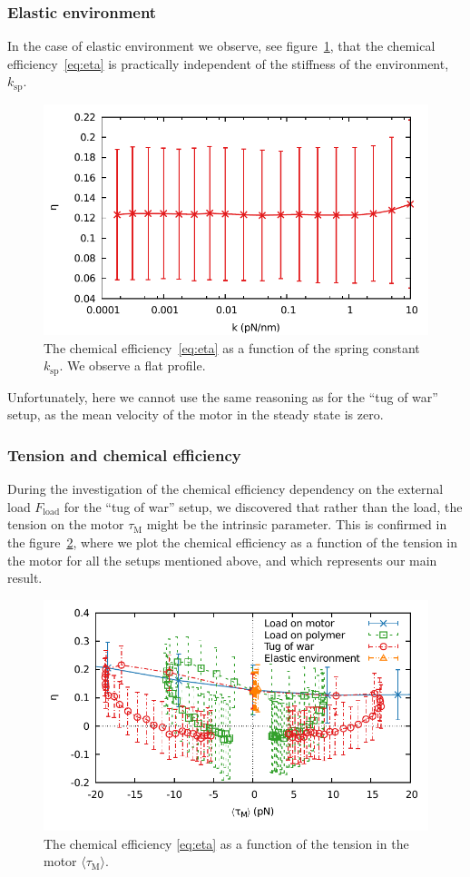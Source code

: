 \documentclass[aps,pre,twocolumn,showpacs,showkeys,superscriptaddress,floatfix]{revtex4-1}
\begin{document}
\subsubsection{Elastic environment}
In the case of elastic environment we observe, see figure~\ref{fig:stiffness_efficiency}, that the chemical efficiency~\eqref{eq:eta} is practically independent of the stiffness of the environment, $k_\text{sp}$. 
\begin{figure}[t]
\centering
\includegraphics[width=.45\textwidth,height=!]{k_eta.pdf}
\caption{\label{fig:stiffness_efficiency}
The chemical efficiency~\eqref{eq:eta} as a function of the spring constant $k_\text{sp}$.
We observe a flat profile.
}
\end{figure}
Unfortunately, here we cannot use the same reasoning as for the ``tug of war'' setup, as the mean velocity of the motor in the steady state is zero. 

\subsubsection{Tension and chemical efficiency}
During the investigation of the chemical efficiency dependency on the external load $F_\text{load}$ for the ``tug of war'' setup, 
we discovered that rather than the load, the tension on the motor $\tau_\text{M}$ might be the intrinsic parameter. 
This is confirmed in the figure~\ref{fig:tension_efficiency}, 
where we plot the chemical efficiency as a function of the tension in the motor for all the setups mentioned above, 
and which represents our main result. 
\begin{figure}[t]
\centering
\includegraphics[width=.45\textwidth,height=!]{tension_eta.pdf}
\caption{\label{fig:tension_efficiency}
The chemical efficiency \eqref{eq:eta} as a function of the tension in the motor $\langle \tau_\text{M} \rangle$.
}
\end{figure}
\end{document}
